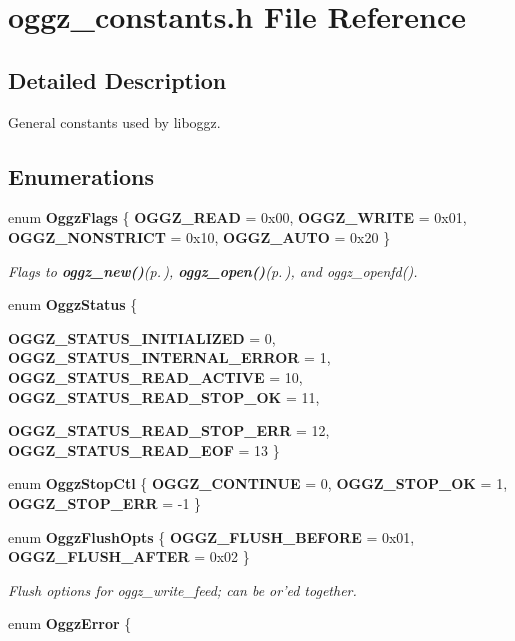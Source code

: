\section{oggz\_\-constants.h File Reference}
\label{oggz__constants_8h}


\subsection{Detailed Description}
General constants used by liboggz. 



\subsection*{Enumerations}
\begin{CompactItemize}
\item 
enum {\bf Oggz\-Flags} \{ {\bf OGGZ\_\-READ} =  0x00, 
{\bf OGGZ\_\-WRITE} =  0x01, 
{\bf OGGZ\_\-NONSTRICT} =  0x10, 
{\bf OGGZ\_\-AUTO} =  0x20
 \}
\begin{CompactList}\small\item\em Flags to {\bf oggz\_\-new()}{\rm (p.\,\pageref{oggz_8h_a4})}, {\bf oggz\_\-open()}{\rm (p.\,\pageref{oggz_8h_a5})}, and oggz\_\-openfd(). \item\end{CompactList}\item 
enum {\bf Oggz\-Status} \{ \par
{\bf OGGZ\_\-STATUS\_\-INITIALIZED} =  0, 
{\bf OGGZ\_\-STATUS\_\-INTERNAL\_\-ERROR} =  1, 
{\bf OGGZ\_\-STATUS\_\-READ\_\-ACTIVE} =  10, 
{\bf OGGZ\_\-STATUS\_\-READ\_\-STOP\_\-OK} =  11, 
\par
{\bf OGGZ\_\-STATUS\_\-READ\_\-STOP\_\-ERR} =  12, 
{\bf OGGZ\_\-STATUS\_\-READ\_\-EOF} =  13
 \}
\item 
enum {\bf Oggz\-Stop\-Ctl} \{ {\bf OGGZ\_\-CONTINUE} =  0, 
{\bf OGGZ\_\-STOP\_\-OK} =  1, 
{\bf OGGZ\_\-STOP\_\-ERR} =  -1
 \}
\item 
enum {\bf Oggz\-Flush\-Opts} \{ {\bf OGGZ\_\-FLUSH\_\-BEFORE} =  0x01, 
{\bf OGGZ\_\-FLUSH\_\-AFTER} =  0x02
 \}
\begin{CompactList}\small\item\em Flush options for oggz\_\-write\_\-feed; can be or'ed together. \item\end{CompactList}\item 
enum {\bf Oggz\-Error} \{ \par

\end{CompactItemize}
